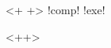 <+	+>	!comp!	!exe!
%

\title{}
\author{}

\begin{CJK*}{UTF8}{fang}
\maketitle
<++>


\newpage
\end{CJK*}

